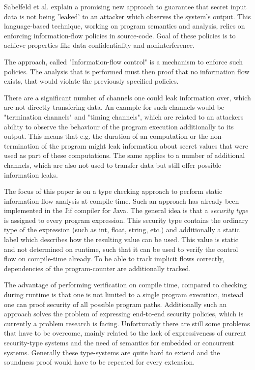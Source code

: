 \documentclass[a4paper,UKenglish]{lipics-v2018}
\begin{document}
Sabelfeld et al. explain a promising new approach to guarantee that secret input data is not being 'leaked' to an attacker which observes the system's output. This language-based technique, working on program semantics and analysis, relies on enforcing information-flow policies in source-code. Goal of these policies is to achieve properties like data confidentiality and noninterference.\cite{language_based_information_flow_security}

The approach, called "Information-flow control" is a mechanism to enforce such policies. The analysis that is performed must then proof that no information flow exists, that would violate the previously specified policies.\cite{language_based_information_flow_security}

There are a significant number of channels one could leak information over, which are not directly transfering data. An example for such channels would be "termination channels" and "timing channels", which are related to an attackers ability to observe the behaviour of the program execution additionally to its output. This means that e.g. the duration of an computation or the non-termination of the program might leak information about secret values that were used as part of these computations.
The same applies to a number of additional channels, which are also not used to transfer data but still offer possible information leaks.\cite{language_based_information_flow_security} %

The focus of this paper is on a type checking approach to perform static information-flow analysis at compile time. Such an approach has already been implemented in the Jif compiler for Java.\cite{JFlow} The general idea is that a \textit{security type} is assigned to every program expression. This security type contains the ordinary type of the expression (such as int, float, string, etc.) and additionally a static label which describes how the resulting value can be used. This value is static and not determined on runtime, such that it can be used to verify the control flow on compile-time already.\cite{language_based_information_flow_security}
To be able to track implicit flows correctly, dependencies of the program-counter are additionally tracked.

The advantage of performing verification on compile time, compared to checking during runtime is that one is not limited to a single program execution, instead one can proof security of all possible program paths.\cite{language_based_information_flow_security} Additionally such an approach solves the problem of expressing end-to-end security policies, which is currently a problem research is facing. Unfortunatly there are still some problems that have to be overcome, mainly related to the lack of expressiveness of current security-type systems and the need of semantics for embedded or concurrent systems. Generally these type-systems are quite hard to extend and the soundness proof would have to be repeated for every extension.\cite{language_based_information_flow_security}
\end{document}

